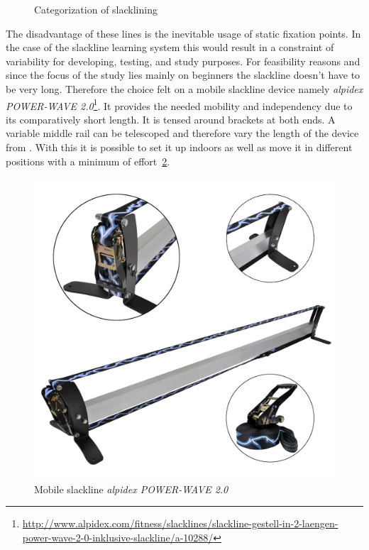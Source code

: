 \begin{figure}[htb]
\begin{minipage}[t]{0.45\linewidth}
		\label{fig:urbanline}
	\end{minipage}
	\caption{Categorization of slacklining}
	\label{fig:slacklineCategorization}
\end{figure}

The disadvantage of these lines is the inevitable usage of static fixation points. In the case of the slackline learning system this would result in a constraint of variability for developing, testing, and study purposes. For feasibility reasons and since the focus of the study lies mainly on beginners the slackline doesn't have to be very long. Therefore the choice felt on a mobile slackline device namely \textit{alpidex POWER-WAVE 2.0}\footnote{\url{http://www.alpidex.com/fitness/slacklines/slackline-gestell-in-2-laengen-power-wave-2-0-inklusive-slackline/a-10288/}}. It provides the needed mobility and independency due to its comparatively short length. It is tensed around brackets at both ends. A variable middle rail can be telescoped and therefore vary the length of the device from \textbf{}. With this it is possible to set it up indoors as well as move it in different positions with a minimum of effort~\ref{fig:3_2_mobileSlackline}.
\begin{figure}[htb]
	\centering
	\begin{minipage}[t]{1\linewidth}
		\centering
		\includegraphics[width=0.44\linewidth]{Pictures/3_2_mobileSlackline}
		\caption{Mobile slackline \textit{alpidex POWER-WAVE 2.0}~\cite{alpidex2017-ms}}
		\label{fig:3_2_mobileSlackline}
	\end{minipage}
\end{figure}
